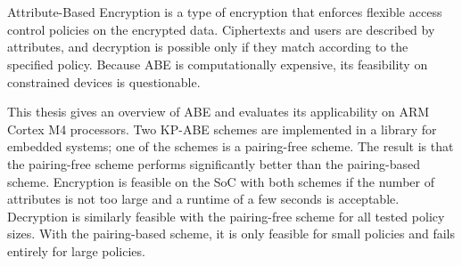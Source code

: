 \chapter{\abstractname}


Attribute-Based Encryption is a type of encryption that enforces flexible access control policies on the encrypted data.
Ciphertexts and users are described by attributes, and decryption is possible only if they match according to the specified policy.
Because ABE is computationally expensive, its feasibility on constrained devices is questionable.

This thesis gives an overview of ABE and evaluates its applicability on ARM Cortex M4 processors.
Two KP-ABE schemes are implemented in a library for embedded systems; one of the schemes is a pairing-free scheme.
The result is that the pairing-free scheme performs significantly better than the pairing-based scheme.
Encryption is feasible on the SoC with both schemes if the number of attributes is not too large and a runtime of a few seconds is acceptable.
Decryption is similarly feasible with the pairing-free scheme for all tested policy sizes.
With the pairing-based scheme, it is only feasible for small policies and fails entirely for large policies.



